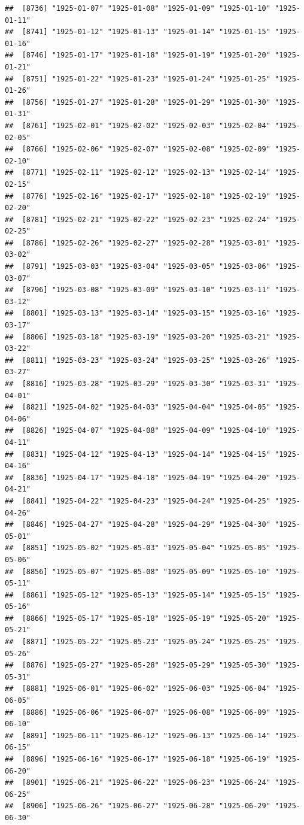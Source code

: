 \documentclass{article}\usepackage[]{graphicx}\usepackage[]{color}
\makeatletter
\newenvironment{kframe}{%
 \def\at@end@of@kframe{}%
 \ifinner\ifhmode%
  \def\at@end@of@kframe{\end{minipage}}%
  \begin{minipage}{\columnwidth}%
 \fi\fi%
 \def\FrameCommand##1{\hskip\@totalleftmargin \hskip-\fboxsep
 \colorbox{shadecolor}{##1}\hskip-\fboxsep
     \hskip-\linewidth \hskip-\@totalleftmargin \hskip\columnwidth}%
 \MakeFramed {\advance\hsize-\width
   \@totalleftmargin\z@ \linewidth\hsize
   \@setminipage}}%
 {\par\unskip\endMakeFramed%
 \at@end@of@kframe}
\newenvironment{knitrout}{}{} %
\makeatother
\begin{document}
\begin{description}
\begin{knitrout}
\begin{kframe}
\begin{verbatim}
##  [8736] "1925-01-07" "1925-01-08" "1925-01-09" "1925-01-10" "1925-01-11"
##  [8741] "1925-01-12" "1925-01-13" "1925-01-14" "1925-01-15" "1925-01-16"
##  [8746] "1925-01-17" "1925-01-18" "1925-01-19" "1925-01-20" "1925-01-21"
##  [8751] "1925-01-22" "1925-01-23" "1925-01-24" "1925-01-25" "1925-01-26"
##  [8756] "1925-01-27" "1925-01-28" "1925-01-29" "1925-01-30" "1925-01-31"
##  [8761] "1925-02-01" "1925-02-02" "1925-02-03" "1925-02-04" "1925-02-05"
##  [8766] "1925-02-06" "1925-02-07" "1925-02-08" "1925-02-09" "1925-02-10"
##  [8771] "1925-02-11" "1925-02-12" "1925-02-13" "1925-02-14" "1925-02-15"
##  [8776] "1925-02-16" "1925-02-17" "1925-02-18" "1925-02-19" "1925-02-20"
##  [8781] "1925-02-21" "1925-02-22" "1925-02-23" "1925-02-24" "1925-02-25"
##  [8786] "1925-02-26" "1925-02-27" "1925-02-28" "1925-03-01" "1925-03-02"
##  [8791] "1925-03-03" "1925-03-04" "1925-03-05" "1925-03-06" "1925-03-07"
##  [8796] "1925-03-08" "1925-03-09" "1925-03-10" "1925-03-11" "1925-03-12"
##  [8801] "1925-03-13" "1925-03-14" "1925-03-15" "1925-03-16" "1925-03-17"
##  [8806] "1925-03-18" "1925-03-19" "1925-03-20" "1925-03-21" "1925-03-22"
##  [8811] "1925-03-23" "1925-03-24" "1925-03-25" "1925-03-26" "1925-03-27"
##  [8816] "1925-03-28" "1925-03-29" "1925-03-30" "1925-03-31" "1925-04-01"
##  [8821] "1925-04-02" "1925-04-03" "1925-04-04" "1925-04-05" "1925-04-06"
##  [8826] "1925-04-07" "1925-04-08" "1925-04-09" "1925-04-10" "1925-04-11"
##  [8831] "1925-04-12" "1925-04-13" "1925-04-14" "1925-04-15" "1925-04-16"
##  [8836] "1925-04-17" "1925-04-18" "1925-04-19" "1925-04-20" "1925-04-21"
##  [8841] "1925-04-22" "1925-04-23" "1925-04-24" "1925-04-25" "1925-04-26"
##  [8846] "1925-04-27" "1925-04-28" "1925-04-29" "1925-04-30" "1925-05-01"
##  [8851] "1925-05-02" "1925-05-03" "1925-05-04" "1925-05-05" "1925-05-06"
##  [8856] "1925-05-07" "1925-05-08" "1925-05-09" "1925-05-10" "1925-05-11"
##  [8861] "1925-05-12" "1925-05-13" "1925-05-14" "1925-05-15" "1925-05-16"
##  [8866] "1925-05-17" "1925-05-18" "1925-05-19" "1925-05-20" "1925-05-21"
##  [8871] "1925-05-22" "1925-05-23" "1925-05-24" "1925-05-25" "1925-05-26"
##  [8876] "1925-05-27" "1925-05-28" "1925-05-29" "1925-05-30" "1925-05-31"
##  [8881] "1925-06-01" "1925-06-02" "1925-06-03" "1925-06-04" "1925-06-05"
##  [8886] "1925-06-06" "1925-06-07" "1925-06-08" "1925-06-09" "1925-06-10"
##  [8891] "1925-06-11" "1925-06-12" "1925-06-13" "1925-06-14" "1925-06-15"
##  [8896] "1925-06-16" "1925-06-17" "1925-06-18" "1925-06-19" "1925-06-20"
##  [8901] "1925-06-21" "1925-06-22" "1925-06-23" "1925-06-24" "1925-06-25"
##  [8906] "1925-06-26" "1925-06-27" "1925-06-28" "1925-06-29" "1925-06-30"

\end{verbatim}
\end{kframe}
\end{knitrout}
\end{description}
\end{document}
